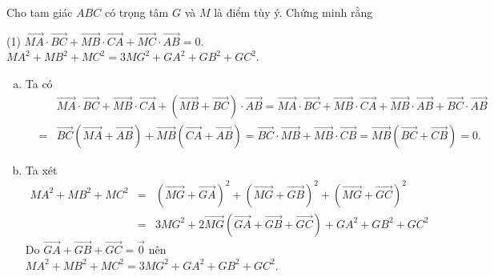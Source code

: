 \begin{bt}%
	Cho tam giác $ABC$ có trọng tâm $G$ và $M$ là điểm tùy ý. Chứng minh rằng
	\begin{tasks}(1)
		\task  $\overrightarrow{MA}\cdot \overrightarrow{BC}+\overrightarrow{MB}\cdot \overrightarrow{CA}+\overrightarrow{MC}\cdot \overrightarrow{AB}=0$.
		\task $MA^2+MB^2+MC^2=3MG^2+GA^2+GB^2+GC^2$.
	\end{tasks}
	\loigiai
	{
		\begin{enumerate}[a)]
			\item Ta có
			\begin{eqnarray*}
				&&\overrightarrow{MA}\cdot \overrightarrow{BC}+\overrightarrow{MB}\cdot \overrightarrow{CA}+\left(\overrightarrow{MB}+\overrightarrow{BC}\right)\cdot \overrightarrow{AB}= \overrightarrow{MA}\cdot \overrightarrow{BC}+\overrightarrow{MB}\cdot \overrightarrow{CA}+\overrightarrow{MB}\cdot \overrightarrow{AB}+\overrightarrow{BC}\cdot \overrightarrow{AB}\\
				&=& \overrightarrow{BC}\left(\overrightarrow{MA}+\overrightarrow{AB}\right)+\overrightarrow{MB}\left(\overrightarrow{CA}+\overrightarrow{AB}\right) = \overrightarrow{BC}\cdot \overrightarrow{MB}+\overrightarrow{MB}\cdot \overrightarrow{CB}= \overrightarrow{MB}\left(\overrightarrow{BC}+\overrightarrow{CB}\right)=0.
			\end{eqnarray*}
			\item Ta xét
				\begin{eqnarray*}
				MA^2+MB^2+MC^2
				&=&\left(\overrightarrow{MG}+\overrightarrow{GA} \right)^2+ \left(\overrightarrow{MG}+\overrightarrow{GB} \right)^2+\left(\overrightarrow{MG}+\overrightarrow{GC} \right)^2\\
				&=& 3MG^2+2\overrightarrow{MG}\left(\overrightarrow{GA}+\overrightarrow{GB}+\overrightarrow{GC} \right)+GA^2+GB^2+GC^2
			\end{eqnarray*}
		Do $\overrightarrow{GA}+\overrightarrow{GB}+\overrightarrow{GC}=\overrightarrow{0}$ nên $MA^2+MB^2+MC^2=3MG^2+GA^2+GB^2+GC^2$.
		
		\end{enumerate}
	}
\end{bt}

